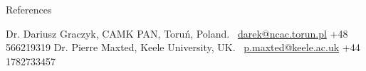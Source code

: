 
\prefix{}
\begin{rubric}{References}

\entry*[1]
Dr. Dariusz Graczyk, CAMK PAN, Toru\'n, Poland. \hspace{3pt} \faEnvelopeO~\url{darek@ncac.torun.pl} \hspace{8pt} \faPhone +48 566219319
\entry*[2]
    Dr. Pierre Maxted, Keele University, UK. \hspace{48.4pt} \faEnvelopeO~\url{p.maxted@keele.ac.uk} \hspace{3pt} \faPhone +44 1782733457
%
%
\end{rubric}